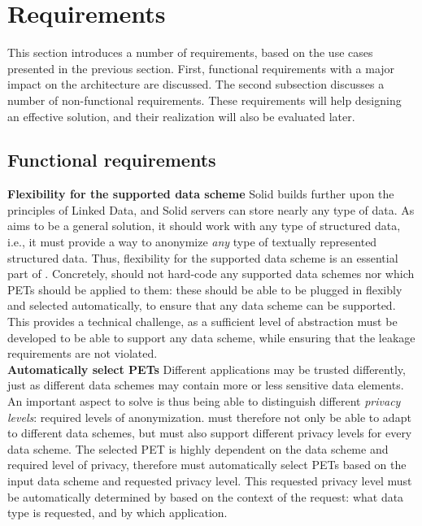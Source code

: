 \newpage
\section{Requirements}
\label{sec:requirements}
This section introduces a number of requirements, based on the use cases presented in the previous section. First, functional requirements with a major impact on the architecture are discussed. The second subsection discusses a number of non-functional requirements. These requirements will help designing an effective solution, and their realization will also be evaluated later.

\subsection{Functional requirements}
\noindent \textbf{Flexibility for the supported data scheme} Solid builds further upon the principles of Linked Data, and Solid servers can store nearly any type of data. As \middleware{} aims to be a general solution, it should work with any type of structured data, i.e., it must provide a way to anonymize \textit{any} type of textually represented structured data. Thus, flexibility for the supported data scheme is an essential part of \middleware{}. Concretely, \middleware{} should not hard-code any supported data schemes nor which \gls{PETs} should be applied to them: these should be able to be plugged in flexibly and selected automatically, to ensure that any data scheme can be supported. This provides a technical challenge, as a sufficient level of abstraction must be developed to be able to support any data scheme, while ensuring that the leakage requirements are not violated. \\

\noindent \textbf{Automatically select \gls{PETs}} Different applications may be trusted differently, just as different data schemes may contain more or less sensitive data elements. An important aspect to solve is thus being able to distinguish different \textit{privacy levels}: required levels of anonymization. \middleware{} must therefore not only be able to adapt to different data schemes, but must also support different privacy levels for every data scheme. The selected PET is highly dependent on the data scheme and required level of privacy, therefore \middleware{} must automatically select \gls{PETs} based on the input data scheme and requested privacy level. This requested privacy level must be automatically determined by \middleware{} based on the context of the request: what data type is requested, and by which application. \\

